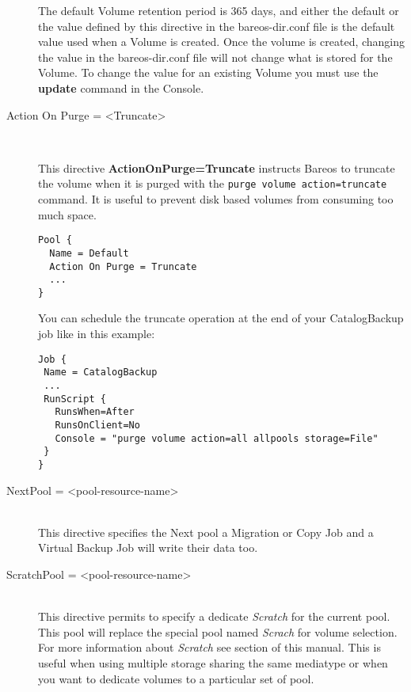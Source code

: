\begin{description}
The default Volume retention period is 365 days, and either the default
or the value defined by this directive in the bareos-dir.conf file is
the default value used when a Volume is created.  Once the volume is
created, changing the value in the bareos-dir.conf file will not change
what is stored for the Volume.  To change the value for an existing
Volume you must use the {\bf update} command in the Console.

\item [Action On Purge = {\textless}Truncate{\textgreater}] \hfill \\

This directive \textbf{ActionOnPurge=Truncate} instructs Bareos to truncate the
volume when it is purged with the \texttt{purge volume action=truncate}
command. It is useful to prevent disk based volumes from consuming too much
space.

\begin{verbatim}
Pool {
  Name = Default
  Action On Purge = Truncate
  ...
}
\end{verbatim}

You can schedule the truncate operation at the end of your CatalogBackup job
like in this example:

\begin{verbatim}
Job {
 Name = CatalogBackup
 ...
 RunScript {
   RunsWhen=After
   RunsOnClient=No
   Console = "purge volume action=all allpools storage=File"
 }
}
\end{verbatim}

\item [NextPool = {\textless}pool-resource-name{\textgreater}] \hfill \\
This directive specifies the Next pool a Migration or Copy Job
and a Virtual Backup Job will write their data too.

\label{PoolScratchPool}
\item [ScratchPool = {\textless}pool-resource-name{\textgreater}] \hfill \\
This directive permits to specify a dedicate \textsl{Scratch} for the
current pool. This pool will replace the special pool named \textsl{Scrach}
for volume selection. For more information about \textsl{Scratch} see
 section of this manual. This is useful
when using multiple storage sharing the same mediatype or when you want to
dedicate volumes to a particular set of pool.


\end{description}
